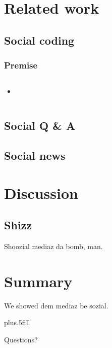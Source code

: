 \documentclass{beamer}
\begin{document}
\section{Related work}

\subsection{Social coding}

\begin{frame}
  \frametitle{Premise}

  \begin{columns}[T]
    \begin{column}{.5\textwidth}
      \begin{itemize}

      \item
        

      \end{itemize}

    \end{column}
    \begin{column}{.5\textwidth}
    \end{column}
  \end{columns}
\end{frame}

\subsection{Social Q \&{} A}

\subsection{Social news}


\section{Discussion}

\subsection{Shizz}

\begin{frame}
  Shoozial mediaz da bomb, man.
\end{frame}

\section*{Summary}

\begin{frame}
  We showed dem mediaz be sozial.

  
  \pause
  \vskip0pt plus.5fill

  Questions?
\end{frame}
\end{document}
